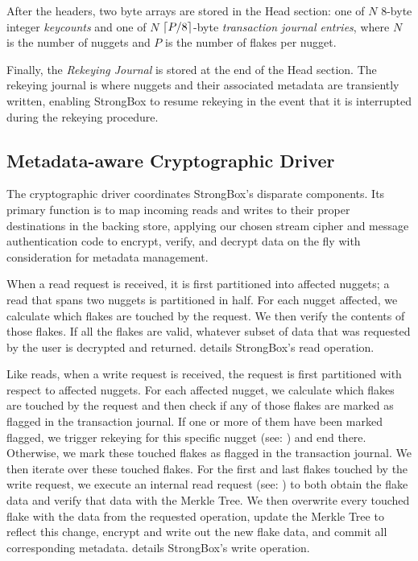 After the headers, two byte arrays are stored in the Head section: one
of $N$ 8-byte integer \textit{keycounts} and one of $N$ $\lceil P /
  8 \rceil$-byte \textit{transaction journal entries}, where $N$ is the
number of nuggets and $P$ is the number of flakes per nugget.

Finally, the \emph{Rekeying Journal} is stored at the end of the Head section.
The rekeying journal is where nuggets and their associated metadata are
transiently written, enabling StrongBox to resume rekeying in the event that it
is interrupted during the rekeying procedure.

\subsection{Metadata-aware Cryptographic Driver}

The cryptographic driver coordinates StrongBox's disparate components.
Its primary function is to map incoming reads and writes to their
proper destinations in the backing store, applying our chosen stream
cipher and message authentication code to encrypt, verify, and decrypt
data on the fly with consideration for metadata management.

When a read request is received, it is first partitioned into affected
nuggets; \eg a read that spans two nuggets is partitioned in half.
For each nugget affected, we calculate which flakes are touched by the
request. We then verify the contents of those flakes. If all the
flakes are valid, whatever subset of data that was requested by the
user is decrypted and returned.  details StrongBox's
read operation.

Like reads, when a write request is received, the request is first
partitioned with respect to affected nuggets. For each affected
nugget, we calculate which flakes are touched by the request and then
check if any of those flakes are marked as flagged in the transaction
journal. If one or more of them have been marked flagged, we trigger
rekeying for this specific nugget (see: ) and end
there. Otherwise, we mark these touched flakes as flagged in the
transaction journal. We then iterate over these touched flakes. For
the first and last flakes touched by the write request, we execute an
internal read request (see: ) to both obtain the flake
data and verify that data with the Merkle Tree. We then overwrite
every touched flake with the data from the requested operation, update
the Merkle Tree to reflect this change, encrypt and write out the new
flake data, and commit all corresponding metadata. 
details StrongBox's write operation.

